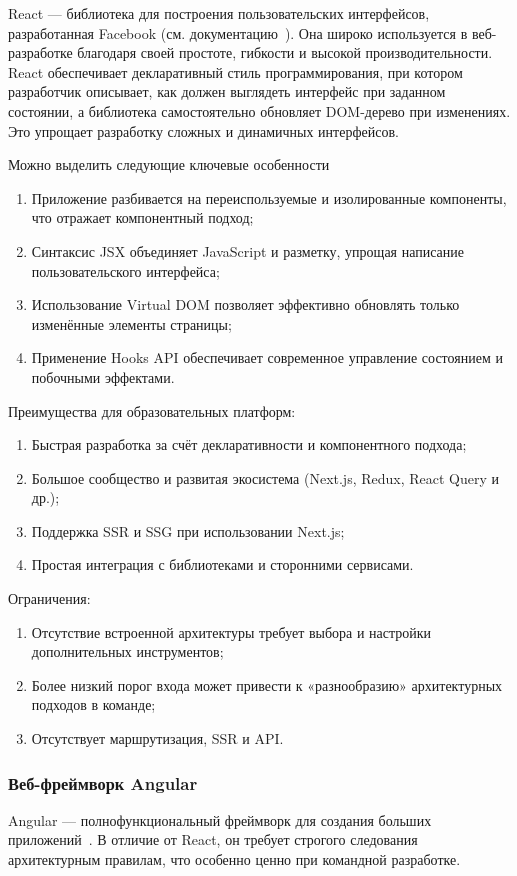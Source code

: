 React — библиотека для построения пользовательских интерфейсов, разработанная Facebook (см. документацию~\cite{react_getting_started}). Она широко используется в веб-разработке благодаря своей простоте, гибкости и высокой производительности. React обеспечивает декларативный стиль программирования, при котором разработчик описывает, как должен выглядеть интерфейс при заданном состоянии, а библиотека самостоятельно обновляет DOM-дерево при изменениях. Это упрощает разработку сложных и динамичных интерфейсов.

Можно выделить следующие ключевые особенности
\begin{enumerate}
  \item Приложение разбивается на переиспользуемые и изолированные компоненты, что отражает компонентный подход;
  \item Синтаксис JSX объединяет JavaScript и разметку, упрощая написание пользовательского интерфейса;
  \item Использование Virtual DOM позволяет эффективно обновлять только изменённые элементы страницы;
  \item Применение Hooks API обеспечивает современное управление состоянием и побочными эффектами.
\end{enumerate}


Преимущества для образовательных платформ:
\begin{enumerate}
  \item Быстрая разработка за счёт декларативности и компонентного подхода;
  \item Большое сообщество и развитая экосистема (Next.js, Redux, React Query и др.);
  \item Поддержка SSR и SSG при использовании Next.js;
  \item Простая интеграция с библиотеками и сторонними сервисами.
\end{enumerate}

Ограничения:
\begin{enumerate}
  \item Отсутствие встроенной архитектуры требует выбора и настройки дополнительных инструментов;
  \item Более низкий порог входа может привести к «разнообразию» архитектурных подходов в команде;
  \item Отсутствует маршрутизация, SSR и API.
\end{enumerate}

\subsubsection{Веб-фреймворк Angular}
Angular --- полнофункциональный фреймворк для создания больших приложений~\cite{angular_overview}. В отличие от React, он требует строгого следования архитектурным правилам, что особенно ценно при командной разработке.

